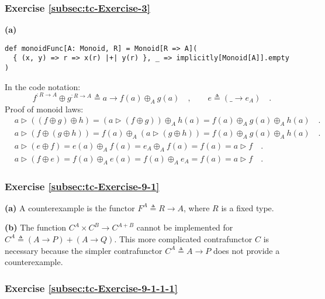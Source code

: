 \subsubsection*{Exercise \ref{subsec:tc-Exercise-3}}

\textbf{(a)}
\begin{lstlisting}
def monoidFunc[A: Monoid, R] = Monoid[R => A](
  { (x, y) => r => x(r) |+| y(r) }, _ => implicitly[Monoid[A]].empty
)
\end{lstlisting}

In the code notation:
\[
f^{:R\rightarrow A}\oplus g^{:R\rightarrow A}\triangleq a\rightarrow f(a)\oplus_{A}g(a)\quad,\quad\quad e\triangleq(\_\rightarrow e_{A})\quad.
\]
Proof of monoid laws:
\begin{align*}
 & a\triangleright\left(\left(f\oplus g\right)\oplus h\right)=\left(a\triangleright(f\oplus g)\right)\oplus_{A}h(a)=f(a)\oplus_{A}g(a)\oplus_{A}h(a)\quad.\\
 & a\triangleright\left(f\oplus\left(g\oplus h\right)\right)=f(a)\oplus_{A}\left(a\triangleright(g\oplus h)\right)=f(a)\oplus_{A}g(a)\oplus_{A}h(a)\quad.\\
 & a\triangleright\left(e\oplus f\right)=e(a)\oplus_{A}f(a)=e_{A}\oplus_{A}f(a)=f(a)=a\triangleright f\quad.\\
 & a\triangleright(f\oplus e)=f(a)\oplus_{A}e(a)=f(a)\oplus_{A}e_{A}=f(a)=a\triangleright f\quad.
\end{align*}


\subsubsection*{Exercise \ref{subsec:tc-Exercise-9-1} }

\textbf{(a)} A counterexample is the functor $F^{A}\triangleq R\rightarrow A$,
where $R$ is a fixed type.

\textbf{(b)} The function $C^{A}\times C^{B}\rightarrow C^{A+B}$
cannot be implemented for $C^{A}\triangleq\left(A\rightarrow P\right)+\left(A\rightarrow Q\right)$.
This more complicated contrafunctor $C$ is necessary because the
simpler contrafunctor $C^{A}\triangleq A\rightarrow P$ does not provide
a counterexample.

\subsubsection*{Exercise \ref{subsec:tc-Exercise-9-1-1-1}}


